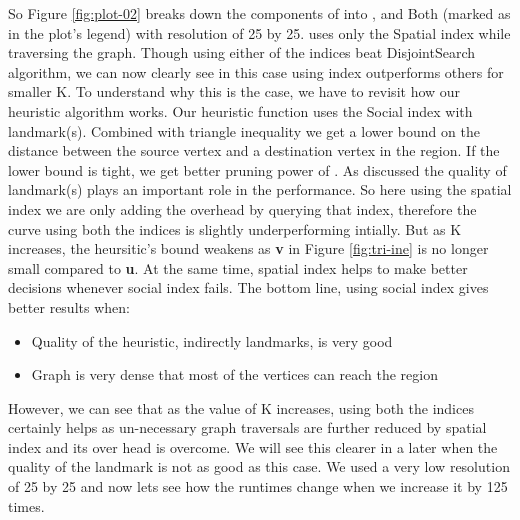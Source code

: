 So Figure \ref{fig:plot-02} breaks down the components of {\rrp} into {\rrpspatial}, {\rrpsocial} and Both (marked as {\rrp} in the plot's legend) with resolution of 25 by 25. {\rrpspatial} uses only the Spatial index while traversing the graph. Though using either of the indices beat DisjointSearch algorithm, we can now clearly see in this case using {\rrpsocial} index outperforms others for smaller K. To understand why this is the case, we have to revisit how our heuristic algorithm works. Our heuristic function uses the Social index with landmark(s). Combined with triangle inequality we get a lower bound on the distance between the source vertex and a destination vertex in the region. If the lower bound is tight, we get better pruning power of {\rrp}. As discussed the quality of landmark(s) plays an important role in the performance. So here using the spatial index we are only adding the overhead by querying that index, therefore the curve using both the indices is slightly underperforming intially. But as K increases, the heursitic's bound weakens as \textbf{v} in Figure \ref{fig:tri-ine} is no longer small compared to \textbf{u}. At the same time, spatial index helps {\rrp} to make better decisions whenever social index fails. The bottom line, using social index gives better results when:
\begin{itemize}
  \item Quality of the heuristic, indirectly landmarks, is very good
  \item Graph is very dense that most of the vertices can reach the region
\end{itemize}

However, we can see that as the value of K increases, using both the indices certainly helps as un-necessary graph traversals are further reduced by spatial index and its over head is overcome. We will see this clearer in a later when the quality of the landmark is not as good as this case. We used a very low resolution of 25 by 25 and now lets see how the runtimes change when we increase it by 125 times.


